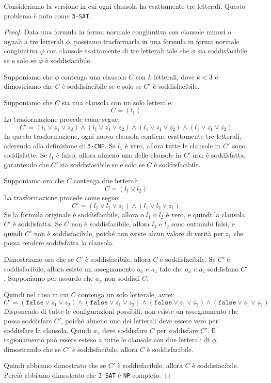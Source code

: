 Consideriamo la versione in cui ogni clausola ha esattamente tre letterali. Questo
problema è noto come \texttt{3-SAT}.

\begin{proof}
    Data una formula in forma normale congiuntiva con clausole minori o uguali a tre
    letterali $\phi$, possiamo trasformarla in una formula in forma normale congiuntiva $\varphi$
    con clausole esattamente di tre letterali tale che $\phi$ sia soddisfacibile se e
    solo se $\varphi$ è soddisfacibile.

    Supponiamo che $\phi$ contenga una clausola $C$ con $k$ letterali, dove $k < 3$ 
    e dimostriamo che $C$ è soddisfacibile se e solo se $C'$ è soddisfacibile.

    Supponiamo che $C$ sia una clausola con un solo letterale:
    \[
        C = (l_1)
    \]
    La trasformazione procede come segue:
    \[
        C' = (l_1 \lor z_1 \lor z_2) \land (l_1 \lor
        \overline{z_1} \lor z_2) \land (l_1 \lor z_1 \lor \overline{z_2})
        \land (l_1 \lor \overline{z_1} \lor \overline{z_2})
    \]
    In questa trasformazione, ogni nuova clausola contiene esattamente tre letterali,
    aderendo alla definizione di \texttt{3-CNF}. Se $l_1$ è vero, allora tutte le
    clausole in $C'$ sono soddisfatte. Se $l_1$ è falso, allora almeno una delle
    clausole in $C'$ non è soddisfatta, garantendo che $C'$ sia soddisfacibile se e
    solo se $C$ è soddisfacibile.

    Supponiamo ora che $C$ contenga due letterali:
    \[
        C = (l_1 \lor l_2)
    \]
    La trasformazione procede come segue:
    \[
        C' = (l_1 \lor l_2 \lor z_1) \land (l_1 \lor l_2 \lor \overline{z_1})
    \]
    Se la formula originale è soddisfacibile, allora o $l_1$ o $l_2$ è vero, e
    quindi la clausola $C'$ è soddisfatta. Se $C$ non è soddisfacibile, allora
    $l_1$ e $l_2$ sono entrambi falsi, e quindi $C'$ non è soddisfacibile, poiché 
    non esiste alcun valore di verità per $z_1$ che possa rendere soddisfatta la
    clausola.

    Dimostriamo ora che se $C'$ è soddisfacibile, allora $C$ è soddisfacibile.
    Se $C'$ è soddisfacibile, allora esiste un assegnamento $a_x$ e $a_z$ tale che
    $a_x$ e $a_z$ soddisfano $C'$. Supponiamo per assurdo che $a_x$ non soddisfi $C$.
    
    Quindi nel caso in cui $C$ contenga un solo letterale, avrei:
    \[
        C' = (\texttt{false} \lor z_1 \lor z_2) \land
        (\texttt{false} \lor \overline{z_1} \lor z_2)
        \land (\texttt{false} \lor z_1 \lor \overline{z_2}) \land
        (\texttt{false} \lor \overline{z_1} \lor \overline{z_2})
    \]
    Disponendo di tutte le configurazioni possibili, non esiste un assegnamento
    che possa soddisfare $C'$, poiché almeno uno dei letterali deve essere vero
    per soddisfare la clausola. Quindi $a_x$ deve soddisfare $C$ per soddisfare
    $C'$. Il ragionamento può essere esteso a tutte le clausole con due letterali
    di $\phi$, dimostrando che se $C'$ è soddisfacibile, allora $C$ è soddisfacibile.

    Quindi abbiamo dimostrato che se $C'$ è soddisfacibile, allora $C$ è soddisfacibile.
    Perciò abbiamo dimostrato che \texttt{3-SAT} è \texttt{NP}-completo.
\end{proof}